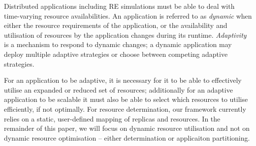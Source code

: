 \documentclass{rspublic}
\newcommand{\glidein}[1]{Glide-In }
\begin{document}
Distributed applications including RE simulations must be able to 
deal with time-varying resource availabilities.
An application is referred to as \emph{dynamic} when either the
resource requirements of the application, or the availability and
utilisation of resources by the application changes during its
runtime.  \emph{Adaptivity} is a mechanism to respond to dynamic
changes; %
a dynamic application may deploy multiple adaptive strategies or
choose between competing adaptive strategies.


For an application to be adaptive, it is necessary for it to be able
to effectively utilise an expanded or reduced set of resources;
additionally for an adaptive application to be scalable it must also
be able to select which resources to utilise efficiently, if not
optimally.  For resource determination, our framework currently relies
on a static, user-defined mapping of replicas and resources.  In the
remainder of this paper, we will focus on dynamic resource utilisation
and not on dynamic resource optimisation -- either determination or
applicaiton partitioning.



\end{document}
